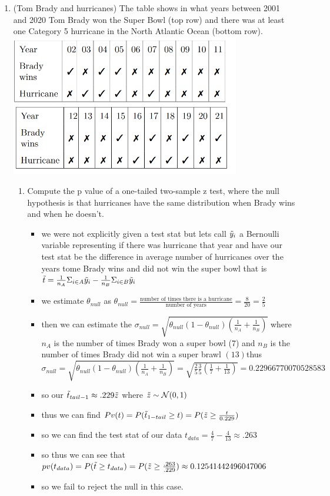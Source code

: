 \documentclass[12pt,twoside]{article}
\begin{document}
\begin{enumerate}
\item (Tom Brady and hurricanes) 
The table shows in what years between 2001 and 2020 Tom Brady won the Super Bowl (top row) and there was at least one Category 5 hurricane in the North Atlantic Ocean (bottom row).\\
\includegraphics[width=10cm]{homework/homework_6/immages/Screenshot 2023-03-19 at 16-23-37 hw6.pdf.png}
\begin{enumerate}
\item Compute the p value of a one-tailed two-sample z test, where the null hypothesis is that hurricanes have the same distribution when Brady wins and when he doesn't. 
\begin{itemize}
    \color{blue}
    \item we were not explicitly given a test stat but lets call $\Tilde{y}_{i}$ a Bernoulli variable representing if there was hurricane that year and have our test stat be the difference in average number of hurricanes over the years tome Brady wins and did not win the super bowl that is $\Tilde{t}=\frac{1}{n_A}\Sigma_{i\in A}\Tilde{y}_i-\frac{1}{n_B}\Sigma_{i\in B}\Tilde{y}_i$
    
    \item we estimate $\theta_{null}$ as $\theta_{null}=\frac{\text{number of times there is a hurricane}}{\text{number of years}}=\frac{8}{20}=\frac{2}{5}$
    \item then we can estimate the $\sigma_{null}=\sqrt{\theta_{null}(1-\theta_{null})(\frac{1}{n_A}+\frac{1}{n_B})}$ where $n_A$ is the number of times Brady won a super bowl (7) and $n_B$ is the number of times Brady did not win a super brawl $(13)$thus $\sigma_{null}=\sqrt{\theta_{null}(1-\theta_{null})(\frac{1}{n_A}+\frac{1}{n_B})}=\sqrt{\frac{2}{5}\frac{3}{5}(\frac{1}{7}+\frac{1}{13})}=0.22966770070528583$
    \item so our $\Tilde{t}_{tail-1}\approx.229\Tilde{z}$ where $\Tilde{z}\sim \mathcal{N}(0,1)$
    \item thus we can find $Pv(t)=P(\Tilde{t}_{1-tail}\geq t)=P(\Tilde{z}\geq \frac{t}{0.229})$ \item so we can find the test stat of our data  ${t}_{data}=\frac{4}{7}-\frac{4}{13}\approx .263$
    \item so thus we can see that $pv({t}_{data})=P(\Tilde{t}\geq {t}_{data})=P(\Tilde{z}\geq \frac{.263}{.229})\approx0.12541442496047006$
    \item so we fail to reject the null in this case. 
\end{itemize}


\end{enumerate}
\end{enumerate}
\end{document}
